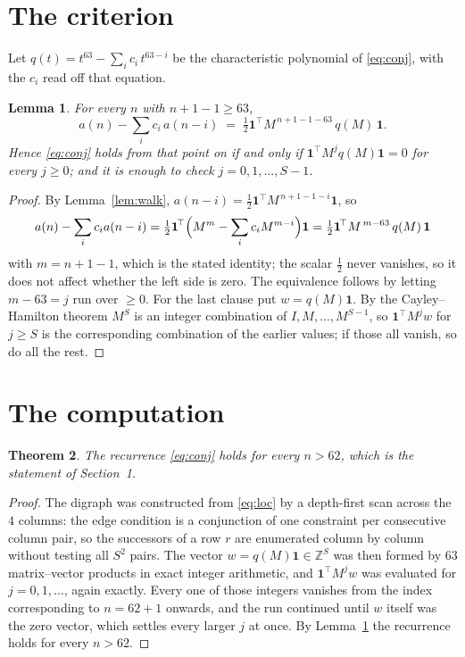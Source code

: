 \documentclass[11pt,a4paper]{article}
\theoremstyle{plain}
\newtheorem{theorem}{Theorem}
\newtheorem{lemma}[theorem]{Lemma}
\theoremstyle{definition}
\begin{document}
\section{The criterion}

Let $q(t)=t^{63}-\sum_i c_i\,t^{63-i}$ be the characteristic polynomial of
\eqref{eq:conj}, with the $c_i$ read off that equation.

\begin{lemma}\label{lem:crit}
For every $n$ with $n+1-1\ge63$,
\[
a(n)-\sum_i c_i\,a(n-i)\;=\;\tfrac1{2}\mathbf{1}^{\!\top}M^{\,n+1-1-63}\,q(M)\,\mathbf{1} .
\]
Hence \eqref{eq:conj} holds from that point on if and only if
$\mathbf{1}^{\!\top}M^{j}q(M)\mathbf{1}=0$ for every $j\ge0$; and it is enough to check
$j=0,1,\dots,S-1$.
\end{lemma}

\begin{proof}
By Lemma~\ref{lem:walk}, $a(n-i)=\tfrac1{2}\mathbf{1}^{\!\top}M^{\,n+1-1-i}\mathbf{1}$, so
\[
a(n)-\sum_i c_i a(n-i)
=\tfrac1{2}\mathbf{1}^{\!\top}\Bigl(M^{m}-\sum_i c_i M^{m-i}\Bigr)\mathbf{1}
=\tfrac1{2}\mathbf{1}^{\!\top}M^{\,m-63}\,q(M)\,\mathbf{1}
\]
with $m=n+1-1$, which is the stated identity; the scalar $\tfrac1{2}$ never vanishes, so
it does not affect whether the left side is zero. The equivalence follows by letting
$m-63=j$ run over $\ge0$. For the last clause put $w=q(M)\mathbf{1}$. By the
Cayley--Hamilton theorem $M^{S}$ is an integer combination of $I,M,\dots,M^{S-1}$, so
$\mathbf{1}^{\!\top}M^{j}w$ for $j\ge S$ is the corresponding combination of the earlier
values; if those all vanish, so do all the rest.
\end{proof}

\section{The computation}

\begin{theorem}
The recurrence \eqref{eq:conj} holds for every $n>62$, which is the statement of
Section~1.
\end{theorem}

\begin{proof}
The digraph was constructed from \eqref{eq:loc} by a depth-first scan across the $4$
columns: the edge condition is a conjunction of one constraint per consecutive column
pair, so the successors of a row $r$ are enumerated column by column without testing all
$S^2$ pairs. The vector $w=q(M)\mathbf{1}\in\mathbb{Z}^{S}$ was then formed by $63$
matrix--vector products in exact integer arithmetic, and $\mathbf{1}^{\!\top}M^{j}w$ was
evaluated for $j=0,1,\dots$, again exactly. Every one of those integers vanishes from the
index corresponding to $n=62+1$ onwards, and the run continued until $w$ itself was the
zero vector, which settles every larger $j$ at once. By Lemma~\ref{lem:crit} the recurrence
holds for every $n>62$.
\end{proof}
\end{document}
